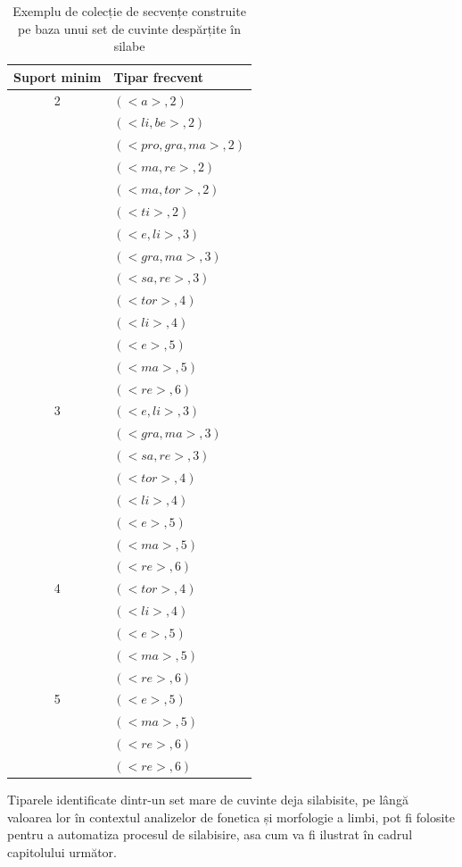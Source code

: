 \begin{table}[h!]
\centering    
\begin{tabular}{|c|l|}    
\hline      
Suport minim & Tipar frecvent\\
\hline
2& $(<a>, 2)$  \\
 & $(<li, be>, 2)$  \\
 & $(<pro, gra, ma>, 2)$  \\
 & $(<ma, re>, 2)$  \\
 & $(<ma, tor>, 2)$  \\
 & $(<ti>, 2)$  \\
 & $(<e, li>, 3)$  \\
 & $(<gra, ma>, 3)$  \\
 & $(<sa, re>, 3)$  \\
 & $(<tor>,4)$  \\
 & $(<li>, 4)$  \\
 & $(<e>, 5)$  \\
 & $(<ma>,5)$  \\
 & $(<re>, 6)$  \\
\hline
3& $(<e, li>, 3)$  \\
 & $(<gra, ma>, 3)$  \\
 & $(<sa, re>, 3)$  \\
 & $(<tor>,4)$  \\
 & $(<li>, 4)$  \\
 & $(<e>, 5)$  \\
 & $(<ma>,5)$  \\
 & $(<re>, 6)$  \\
\hline
4& $(<tor>,4)$  \\
 & $(<li>, 4)$  \\
 & $(<e>, 5)$  \\
 & $(<ma>,5)$  \\
 & $(<re>, 6)$  \\
\hline
5& $(<e>, 5)$  \\
 & $(<ma>,5)$  \\
 & $(<re>, 6)$  \\
\hline
 & $(<re>, 6)$  \\
\hline                              
\end{tabular}
\caption{Exemplu de colecție de secvențe construite pe baza unui set de cuvinte despărțite în silabe}
\label{table:sdb_patterns}               
\end{table}

Tiparele identificate dintr-un set mare de cuvinte deja silabisite, pe lângă valoarea lor în contextul analizelor de fonetica și morfologie a limbi, pot fi folosite pentru a automatiza procesul de silabisire, asa cum va fi ilustrat în cadrul capitolului următor.


